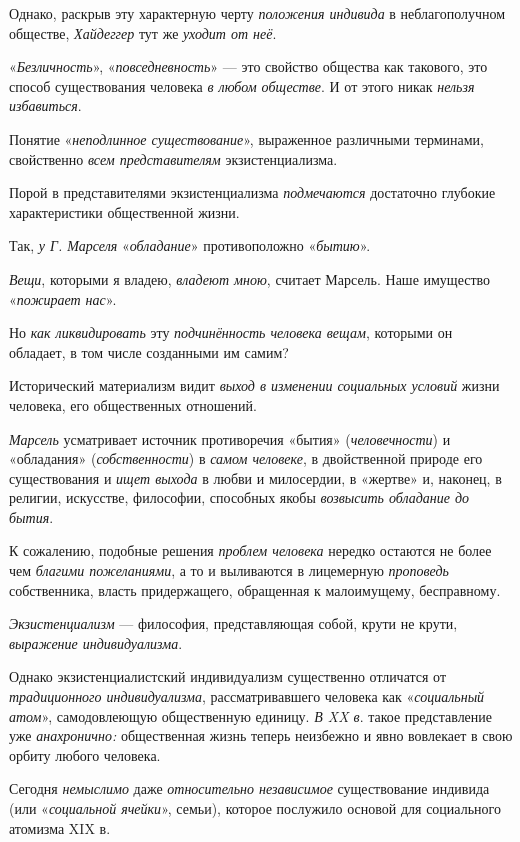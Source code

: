 \documentclass[a4paper,14pt,russian]{extreport}
\begin{document}
Однако, раскрыв эту характерную черту \emph{положения индивида} в неблагополучном обществе, \emph{Хайдеггер} тут же \emph{уходит от неё}.

«\emph{Безличность}», «\emph{повседневность}» --- это свойство общества как такового, это способ существования человека \emph{в любом обществе}. И от этого никак \emph{нельзя избавиться}.

Понятие «\emph{неподлинное существование}», выраженное различными терминами, свойственно \emph{всем представителям} экзистенциализма.

Порой в представителями экзистенциализма \emph{подмечаются} достаточно глубокие характеристики общественной жизни.

Так, \emph{у Г. Марселя} «\emph{обладание}» противоположно «\emph{бытию}».

\emph{Вещи}, которыми я владею, \emph{владеют мною}, считает Марсель. Наше имущество «\emph{пожирает нас}».

Но \emph{как ликвидировать} эту \emph{подчинённость человека вещам}, которыми он обладает, в том числе созданными им самим?

Исторический материализм видит \emph{выход в изменении социальных условий} жизни человека, его общественных отношений.

\emph{Марсель} усматривает источник противоречия «бытия» (\emph{человечности}) и «обладания» (\emph{собственности}) в \emph{самом человеке}, в двойственной природе его существования и \emph{ищет выхода} в любви и милосердии, в «жертве» и, наконец, в религии, искусстве, философии, способных якобы \emph{возвысить обладание до бытия}.

К сожалению, подобные решения \emph{проблем человека} нередко остаются не более чем \emph{благими пожеланиями}, а то и выливаются в лицемерную \emph{проповедь} собственника, власть придержащего, обращенная к малоимущему, бесправному.

\emph{Экзистенциализм} --- философия, представляющая собой, крути не крути, \emph{выражение индивидуализма}.

Однако экзистенциалистский индивидуализм существенно отличатся от \emph{традиционного индивидуализма}, рассматривавшего человека как «\emph{социальный атом}», самодовлеющую общественную единицу. \emph{В XX в}. такое представление уже \emph{анахронично:} общественная жизнь теперь неизбежно и явно вовлекает в свою орбиту любого человека.

Сегодня \emph{немыслимо} даже \emph{относительно независимое} существование индивида (или «\emph{социальной ячейки}», семьи), которое послужило основой для социального атомизма XIX в.
\end{document}
